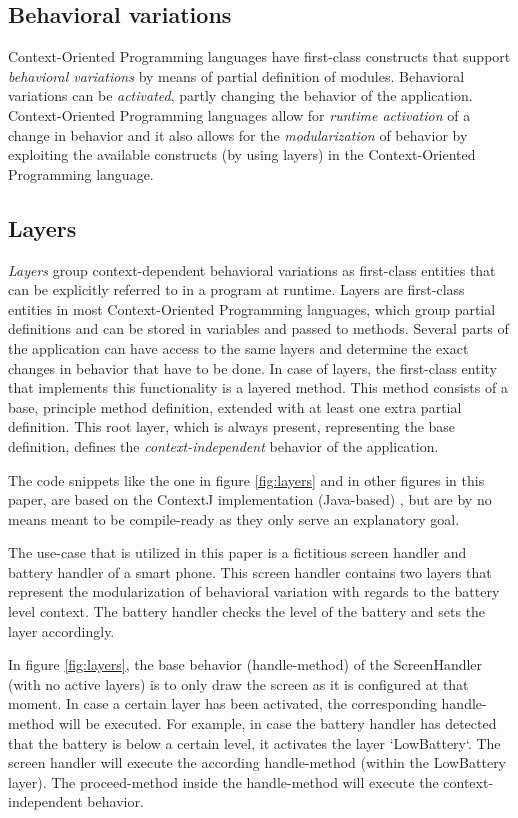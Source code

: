 \documentclass{acm_proc_article-sp}
\begin{document}
\subsection{Behavioral variations}
\label{sec:behavioral_variations}
Context-Oriented Programming languages have first-class constructs that support \textit{behavioral variations} by means of partial definition of modules. Behavioral variations can be \textit{activated}, partly changing the behavior of the application. Context-Oriented Programming languages allow for \textit{runtime activation} of a change in behavior and it also allows for the \textit{modularization} of behavior by exploiting the available constructs (by using layers) in the Context-Oriented Programming language.    

\subsection{Layers}
\label{sec:layers}
\textit{Layers} group context-dependent behavioral variations as first-class entities that can be explicitly referred to in a program at runtime. Layers are first-class entities in most Context-Oriented Programming languages, which group partial definitions and can be stored in variables and passed to methods. Several parts of the application can have access to the same layers and determine the exact changes in behavior that have to be done. In case of layers, the first-class entity that implements this functionality is a layered method. This method consists of a base, principle method definition, extended with at least one extra partial definition. This root layer, which is always present, representing the base definition, defines the \textit{context-independent} behavior of the application.

The code snippets like the one in figure \ref{fig:layers} and in other figures in this paper, are based on the ContextJ implementation (Java-based) \cite{Appeltauer:2009:IDC:1562112.1562117}, but are by no means meant to be compile-ready as they only serve an explanatory goal. 

The use-case that is utilized in this paper is a fictitious screen handler and battery handler of a smart phone. This screen handler contains two layers that represent the modularization of behavioral variation with regards to the battery level context. The battery handler checks the level of the battery and sets the layer accordingly.

In figure \ref{fig:layers}, the base behavior (handle-method) of the ScreenHandler (with no active layers) is to only draw the screen as it is configured at that moment. In case a certain layer has been activated, the corresponding handle-method will be executed. For example, in case the battery handler has detected that the battery is below a certain level, it activates the layer `LowBattery`. The screen handler will execute the according handle-method (within the LowBattery layer). The proceed-method inside the handle-method will execute the context-independent behavior.
 
\end{document}

